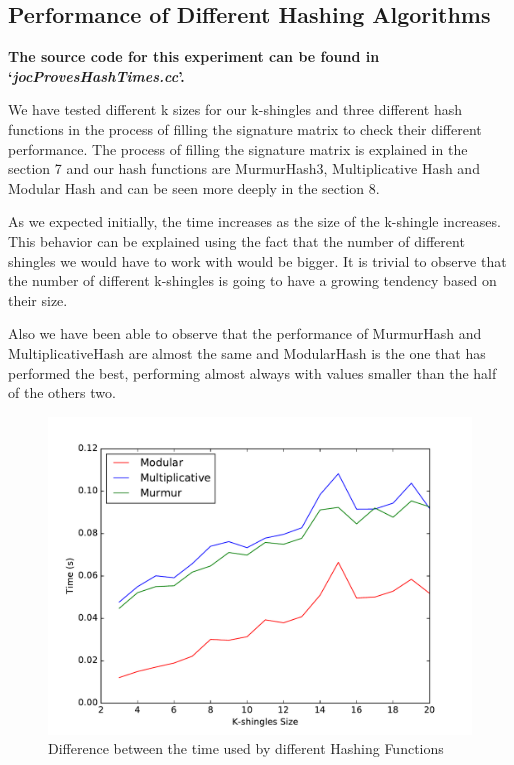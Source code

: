 \documentclass[12pt]{article}
\begin{document}
\subsection{Performance of Different Hashing Algorithms}
\textbf{The source code for this experiment can be found in `\textit{jocProvesHashTimes.cc}'.}
\bigskip

We have tested different k sizes for our k-shingles and three different hash functions in the process of filling the signature matrix to check their different performance. The process of filling the signature matrix is explained in the section 7 and our hash functions are MurmurHash3, Multiplicative Hash and Modular Hash and can be seen more deeply in the section 8.

As we expected initially, the time increases as the size of the k-shingle increases. This behavior can be explained using the fact that the number of different shingles we would have to work with would be bigger. It is trivial to observe that the number of different k-shingles is going to have a growing tendency based on their size. 

Also we have been able to observe that the performance of MurmurHash and MultiplicativeHash are almost the same and ModularHash is the one that has performed the best, performing almost always with values smaller than the half of the others two.



\begin{figure}[H]
	\centering
	\includegraphics[scale=0.55]{graphs/HashFunctionsJaccardAproxTime.pdf} 
	\caption{Difference between the time used by different Hashing Functions}
	\label{fig:HhashFunctionsTime}
\end{figure}
\end{document}
